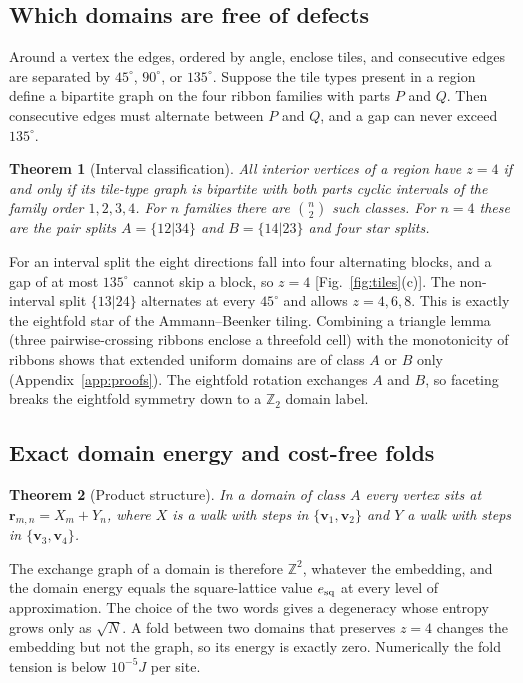 \documentclass[aps,prb,twocolumn,superscriptaddress,floatfix]{revtex4-2}
\newtheorem{theorem}{Theorem}
\begin{document}
\subsection{Which domains are free of defects}

Around a vertex the edges, ordered by angle, enclose tiles, and consecutive edges are separated by $45^\circ$, $90^\circ$, or $135^\circ$. Suppose the tile types present in a region define a bipartite graph on the four ribbon families with parts $P$ and $Q$. Then consecutive edges must alternate between $P$ and $Q$, and a gap can never exceed $135^\circ$.

\begin{theorem}[Interval classification]
All interior vertices of a region have $z=4$ if and only if its tile-type graph is bipartite with both parts cyclic intervals of the family order $1,2,3,4$. For $n$ families there are $\binom n2$ such classes. For $n=4$ these are the pair splits $A=\{12|34\}$ and $B=\{14|23\}$ and four star splits.
\end{theorem}

For an interval split the eight directions fall into four alternating blocks, and a gap of at most $135^\circ$ cannot skip a block, so $z=4$ [Fig.~\ref{fig:tiles}(c)]. The non-interval split $\{13|24\}$ alternates at every $45^\circ$ and allows $z=4,6,8$. This is exactly the eightfold star of the Ammann--Beenker tiling. Combining a triangle lemma (three pairwise-crossing ribbons enclose a threefold cell) with the monotonicity of ribbons shows that extended uniform domains are of class $A$ or $B$ only (Appendix~\ref{app:proofs}). The eightfold rotation exchanges $A$ and $B$, so faceting breaks the eightfold symmetry down to a $\mathbb Z_2$ domain label.

\subsection{Exact domain energy and cost-free folds}

\begin{theorem}[Product structure]
In a domain of class $A$ every vertex sits at $\mathbf r_{m,n}=X_m+Y_n$, where $X$ is a walk with steps in $\{\mathbf v_1,\mathbf v_2\}$ and $Y$ a walk with steps in $\{\mathbf v_3,\mathbf v_4\}$.
\end{theorem}

The exchange graph of a domain is therefore $\mathbb Z^2$, whatever the embedding, and the domain energy equals the square-lattice value $e_{\rm sq}$ at every level of approximation. The choice of the two words gives a degeneracy whose entropy grows only as $\sqrt N$. A fold between two domains that preserves $z=4$ changes the embedding but not the graph, so its energy is exactly zero. Numerically the fold tension is below $10^{-5}J$ per site.
\end{document}
